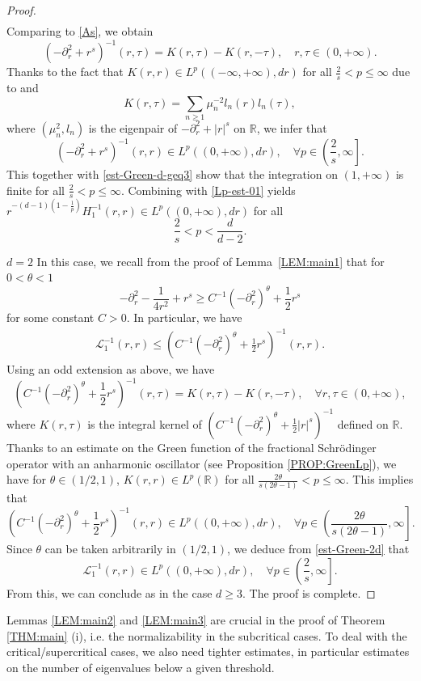 \documentclass[%
11pt,  reqno]{amsart}
\theoremstyle{remarkstyle}
\newcommand{\1}{\hspace{0.2mm}\text{I}\hspace{0.2mm}}
\newcommand{\R}{\mathbb{R}}
\renewcommand{\L}{\mathcal{L}}
\numberwithin{equation}{section}
\numberwithin{theorem}{section}
\begin{document}
\begin{proof}
\begin{align*}
		\end{align*}
		Comparing to \eqref{As}, we obtain
		\[
		(-\partial^2_r +r^s)^{-1}(r,\tau) = K(r,\tau) - K(r,-\tau), \quad r, \tau \in (0,+\infty).
		\]
		Thanks to the fact that $K(r,r) \in L^p((-\infty,+\infty),dr)$ for all $\frac{2}{s}<p\leq \infty$ due to \cite[Lemma 3.2]{LNR18} and
		\[
		K(r,\tau) = \sum_{n\geq 1} \mu_n^{-2} l_n(r)l_n(\tau),
		\] 
		where $(\mu_n^2,l_n)$ is the eigenpair of $-\partial^2_r +|r|^s$ on $\R$, we infer that
		\[
		(-\partial^2_r +r^s)^{-1}(r,r) \in L^p((0,+\infty),dr), \quad \forall p \in \left(\frac{2}{s},\infty\right].
		\]
		This together with \eqref{est-Green-d-geq3} show that the integration on $(1,+\infty)$ is finite for all $\frac{2}{s}<p\leq \infty$. Combining with \eqref{Lp-est-01} yields $r^{-(d-1)\left(1-\frac{1}{p}\right)} H_1^{-1}(r,r)\in L^p((0,+\infty),dr)$ for all
		\[
		\frac{2}{s}<p<\frac{d}{d-2}.
		\]
		
		$\boxed{d=2}$ In this case, we recall from the proof of Lemma~\ref{LEM:main1} that for $0<\theta < 1$
		\[
		-\partial^2_r -\frac{1}{4r^2} + r^s \geq C^{-1} (-\partial^2_r)^\theta + \frac{1}{2} r^s
		\]
		for some constant $C>0$. In particular, we have 
		\begin{align} \label{est-Green-2d}
			\L_1^{-1}(r,r) \leq \left( C^{-1}(-\partial^2_r)^\theta +\frac{1}{2} r^s\right)^{-1}(r,r).
		\end{align}
		Using an odd extension as above, we have
		$$
		\left( C^{-1}(-\partial^2_r)^\theta +\frac{1}{2} r^s\right)^{-1}(r,\tau) = K(r,\tau) - K(r,-\tau), \quad \forall r,\tau\in (0,+\infty),
		$$
		where $K(r,\tau)$ is the integral kernel of $\left(C^{-1}(-\partial^2_r)^\theta +\frac{1}{2} |r|^s\right)^{-1}$ defined on $\R$. Thanks to an estimate on the Green function of the fractional Schr\"odinger operator with an anharmonic oscillator (see Proposition \ref{PROP:GreenLp}), we have for $\theta \in (1/2,1)$, $K(r,r) \in L^p(\R)$ for all $\frac{2\theta}{s(2\theta-1)}<p\leq \infty$. This implies that
		\[
		\left( C^{-1}(-\partial^2_r)^\theta +\frac{1}{2} r^s\right)^{-1}(r,r) \in L^p((0,+\infty),dr), \quad \forall p \in \left(\frac{2\theta}{s(2\theta-1)},\infty\right].
		\]
		Since $\theta$ can be taken arbitrarily in $(1/2,1)$, we deduce from \eqref{est-Green-2d} that
		$$
		\L_1^{-1}(r,r) \in L^p((0,+\infty),dr), \quad \forall p \in \left(\frac{2}{s},\infty\right].
		$$
		From this, we can conclude as in the case $d\geq 3$. The proof is complete.
	\end{proof}
	
	Lemmas \ref{LEM:main2} and \ref{LEM:main3} are crucial in the proof of Theorem \ref{THM:main} (i), i.e. the normalizability in the subcritical cases. To deal with the critical/supercritical cases, we  also need tighter estimates, in particular estimates on the number of eigenvalues below a given threshold. 
	
\end{document}
